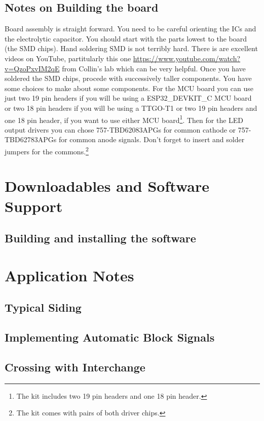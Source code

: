 \subsection{Notes on Building the board}

Board assembly is straight forward. You need to be careful orienting the ICs
and the electrolytic capacitor. You should start with the parts lowest to the
board (the SMD chips). Hand soldering SMD is not terribly hard. There is are
excellent videos on YouTube, partitularly this one
\url{https://www.youtube.com/watch?v=QzoPxvIM2qE} from Collin's lab which can
be very helpful. Once you have soldered the SMD chips, procede with
successively taller components. You have some choices to make about some
components. For the MCU board you can use just two 19 pin headers if you will
be using a ESP32\_DEVKIT\_C MCU board or two 18 pin headers if you will be
using a TTGO-T1 or two 19 pin headers and one 18 pin header, if you want to
use either MCU board\footnote{The kit includes two 19 pin headers and one 18
pin header.}. Then for the LED output drivers you can chose 757-TBD62083APGs
for common cathode or 757-TBD62783APGs for common anode signals. Don't forget
to insert and solder jumpers for the commons.\footnote{The kit comes with
pairs of both driver chips.}

\clearpage
\section{Downloadables and Software Support}

\subsection{Building and installing the software}

\section{Application Notes}

\subsection{Typical Siding}

\subsection{Implementing Automatic Block Signals}

\subsection{Crossing with Interchange}


